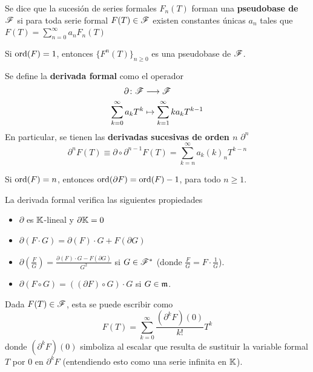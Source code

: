 \begin{definicion}
    Se dice que la sucesión de series formales $F_n(T)$ forman una \textbf{pseudobase de $\mathscr{F}$} si para toda serie formal $F(T) \in \mathscr{F}$ existen constantes únicas $a_n$ tales que $F(T) = \sum_{n=0}^\infty a_n F_n(T)$
\end{definicion}

\begin{proposicion}
    Si $\operatorname*{ord}(F) = 1$, entonces $\{F^n(T)\}_{n \geq 0}$ es una pseudobase de $\mathscr{F}$.
\end{proposicion}

\begin{definicion}
    Se define la \textbf{derivada formal} como el operador
    \begin{align*}
        \partial \colon \mathscr{F} & \longrightarrow \mathscr{F} \\
        \sum_{k=0}^{\infty} a_k T^k & \mapsto \sum_{k=1}^{\infty} ka_k T^{k-1}
    \end{align*}
    En particular, se tienen las \textbf{derivadas sucesivas de orden $n$} $\partial^n$
    \begin{equation*}
        \partial^n F(T) \equiv \partial \circ \partial^{n-1} F(T) = \sum_{k=n}^{\infty} a_k (k)_n T^{k-n}
    \end{equation*}
\end{definicion}

\begin{proposicion}
    Si $\operatorname*{ord}(F) = n$, entonces $\operatorname*{ord}(\partial F) = \operatorname*{ord}(F) - 1$, para todo $n \geq 1$.
\end{proposicion}

\begin{proposicion}
    La derivada formal verifica las siguientes propiedades
    \begin{itemize}
        \item $\partial$ es $\mathbb{K}$-lineal y $\partial \mathbb{K} = 0$
        \item $\partial(F \cdot G) = \partial(F) \cdot G + F (\partial G)$
        \item $\partial (\frac{F}{G}) = \frac{\partial(F) \cdot G - F (\partial G)}{G^2}$ si $G \in \mathscr{F}^*$ (donde $\frac{F}{G} = F \cdot \frac{1}{G}$).
        \item $\partial(F \circ G) = ((\partial F) \circ G) \cdot G$ si $G \in \mathfrak{m}$.
    \end{itemize}
\end{proposicion}

\begin{proposicion}
    Dada $F(T) \in \mathscr{F}$, esta se puede escribir como
    \begin{equation*}
        F(T) = \sum_{k=0}^\infty \frac{(\partial^k F)(0)}{k!}T^k
    \end{equation*}
    donde $(\partial^k F)(0)$ simboliza al escalar que resulta de sustituir la variable formal $T$ por $0$ en $\partial^k F$ (entendiendo esto como una serie infinita en $\mathbb{K}$).
\end{proposicion}

